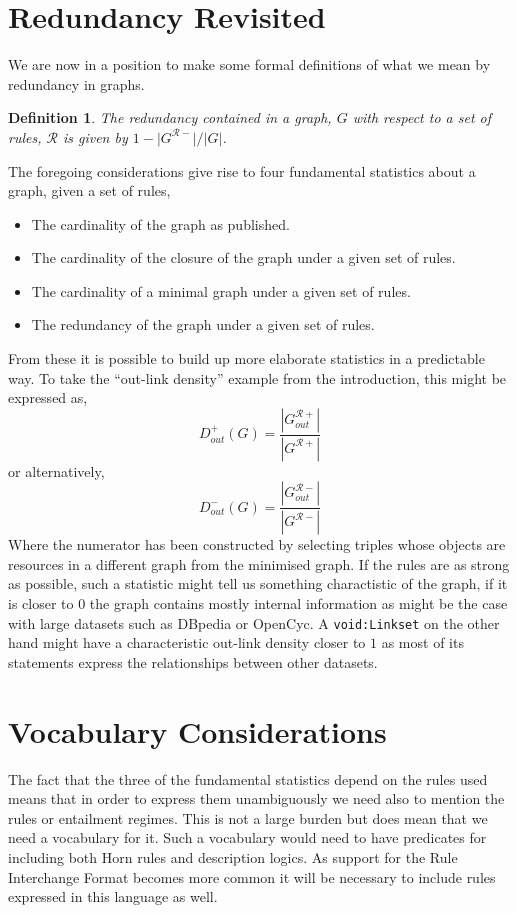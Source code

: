 \documentclass{article}
\newtheorem{defn}{Definition}
\begin{document}
\section{Redundancy Revisited}

We are now in a position to make some formal definitions of
what we mean by redundancy in graphs.

\begin{defn}
  The {\em redundancy} contained in a graph, $G$ with respect
  to a set of rules, ${\mathcal R}$ is given by
  $1 - {|G^{{\mathcal R}-}}|/{|G|}$.
\end{defn}

The foregoing considerations give rise to four fundamental
statistics about a graph, given a set of rules,

\begin{itemize}
  \item The cardinality of the graph as published.
  \item The cardinality of the closure of the graph under a given
    set of rules.
  \item The cardinality of a minimal graph under a given set of
    rules.
  \item The redundancy of the graph under a given set of rules.
\end{itemize}

From these it is possible to build up more elaborate statistics
in a predictable way. To take the ``out-link density'' example
from the introduction, this might be expressed as,
$$
D^{+}_{out}(G) = \frac{|G^{{\mathcal R}+}_{out}|}{|G^{{\mathcal R}+}|}
$$
or alternatively,
$$
D^{-}_{out}(G) = \frac{|G^{{\mathcal R}-}_{out}|}{|G^{{\mathcal R}-}|}
$$
Where the numerator has been constructed by selecting triples 
whose objects are resources in a different graph from the minimised
graph. If the rules are as strong as possible, such a statistic
might tell us something charactistic of the graph, if it is closer
to $0$ the graph contains mostly internal information as might be
the case with large datasets such as DBpedia or OpenCyc. A
\texttt{void:Linkset} on the other hand might have a characteristic
out-link density closer to $1$ as most of its statements express
the relationships between other datasets.

\section{Vocabulary Considerations}

The fact that the three of the fundamental statistics depend on the
rules used means that in order to express them unambiguously we need
also to mention the rules or entailment regimes. This is not a large
burden but does mean that we need a vocabulary for it. Such a
vocabulary would need to have predicates for including both Horn rules
and description logics. As support for the Rule Interchange Format
\cite{RIFBLD10} becomes more common it will be necessary to 
include rules expressed in this language as well.
\end{document}
